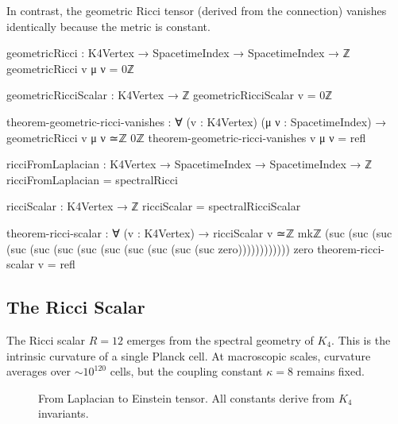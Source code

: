 \documentclass[11pt,a4paper]{book}
\begin{document}
In contrast, the geometric Ricci tensor (derived from the connection) vanishes identically because the metric is constant.

\begin{code}
geometricRicci : K4Vertex → SpacetimeIndex → SpacetimeIndex → ℤ
geometricRicci v μ ν = 0ℤ

geometricRicciScalar : K4Vertex → ℤ
geometricRicciScalar v = 0ℤ

theorem-geometric-ricci-vanishes : ∀ (v : K4Vertex) (μ ν : SpacetimeIndex) →
  geometricRicci v μ ν ≃ℤ 0ℤ
theorem-geometric-ricci-vanishes v μ ν = refl

ricciFromLaplacian : K4Vertex → SpacetimeIndex → SpacetimeIndex → ℤ
ricciFromLaplacian = spectralRicci

ricciScalar : K4Vertex → ℤ
ricciScalar = spectralRicciScalar

theorem-ricci-scalar : ∀ (v : K4Vertex) → 
  ricciScalar v ≃ℤ mkℤ (suc (suc (suc (suc (suc (suc (suc (suc (suc (suc (suc (suc zero)))))))))))) zero
theorem-ricci-scalar v = refl

\end{code}

\subsection{The Ricci Scalar}

The Ricci scalar $R = 12$ emerges from the spectral geometry of $K_4$. This is the intrinsic curvature of a single Planck cell. At macroscopic scales, curvature averages over $\sim 10^{120}$ cells, but the coupling constant $\kappa = 8$ remains fixed.

\begin{figure}[h]
\centering
{}
\caption{From Laplacian to Einstein tensor. All constants derive from $K_4$ invariants.}
\label{fig:ricci-scalar}
\end{figure}
\end{document}
